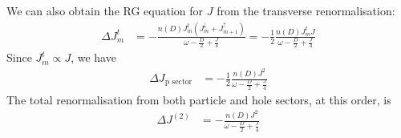 \documentclass[reprint,prb,superscriptaddress]{revtex4-2}
\begin{document}
We can also obtain the RG equation for \(J\) from the transverse renormalisation:
\begin{equation}\begin{aligned}
	\Delta J^t_m &= - \frac{n(D)J^t_m \left( J^\downarrow_m + J^\uparrow_{m+1} \right) }{\omega - \frac{D}{2} + \frac{J}{4}} = -\frac{1}{2}\frac{n(D)J^t_m J}{\omega - \frac{D}{2} + \frac{J}{4}}
\end{aligned}\end{equation}
Since \(J^t_m \propto J\), we have
\begin{equation}\begin{aligned}
	\Delta J_\text{p sector} &= -\frac{1}{2}\frac{n(D)J^2}{\omega - \frac{D}{2} + \frac{J}{4}}
\end{aligned}\end{equation}
The total renormalisation from both particle and hole sectors, at this order, is
\begin{equation}\begin{aligned}
	\Delta J^{(2)} &= -\frac{n(D)J^2}{\omega - \frac{D}{2} + \frac{J}{4}}
\end{aligned}\end{equation}
\end{document}
